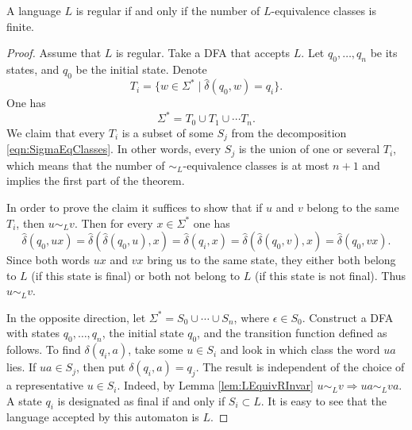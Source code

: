 \begin{page}

\begin{thm}
A language $L$ is regular if and only if the number of $L$-equivalence classes is finite.
\end{thm}

\end{page}

\begin{page}

\begin{proof}
Assume that $L$ is regular.
Take a DFA that accepts $L$.
Let $q_0, \ldots, q_n$ be its states, and $q_0$ be the initial state.
Denote
\[
T_i = \{w \in \Sigma^* \mid \widehat{\delta}(q_0, w) = q_i\}.
\]
One has
\[
\Sigma^* = T_0 \cup T_1 \cup \cdots T_n.
\]
We claim that every $T_i$ is a subset of some $S_j$ from the decomposition \eqref{eqn:SigmaEqClasses}.
In other words, every $S_j$ is the union of one or several $T_i$,
which means that the number of $\sim_L$-equivalence classes is at most $n+1$ and implies the first part of the theorem.

In order to prove the claim it suffices to show that if $u$ and $v$ belong to the same $T_i$, then $u \sim_L v$.
Then for every $x \in \Sigma^*$ one has
\[
\widehat{\delta}(q_0, ux) = \widehat{\delta}(\widehat{\delta}(q_0,u), x) = \widehat{\delta}(q_i, x)
= \widehat{\delta}(\widehat{\delta}(q_0,v), x) = \widehat{\delta}(q_0, vx).
\]
Since both words $ux$ and $vx$ bring us to the same state, they either both belong to $L$ (if this state is final)
or both not belong to $L$ (if this state is not final).
Thus $u \sim_L v$.


In the opposite direction, let $\Sigma^* = S_0 \cup \cdots \cup S_n$, where $\epsilon \in S_0$.
Construct a DFA with states $q_0, \ldots, q_n$, the initial state $q_0$, and the transition function defined as follows.
To find $\delta(q_i, a)$, take some $u \in S_i$ and look in which class the word $ua$ lies.
If $ua \in S_j$, then put $\delta(q_i, a) = q_j$.
The result is independent of the choice of a representative $u \in S_i$.
Indeed, by Lemma \ref{lem:LEquivRInvar} $u \sim_L v \Rightarrow ua \sim_L va$.
A state $q_i$ is designated as final if and only if $S_i \subset L$.
It is easy to see that the language accepted by this automaton is $L$.
\end{proof}



\end{page}

